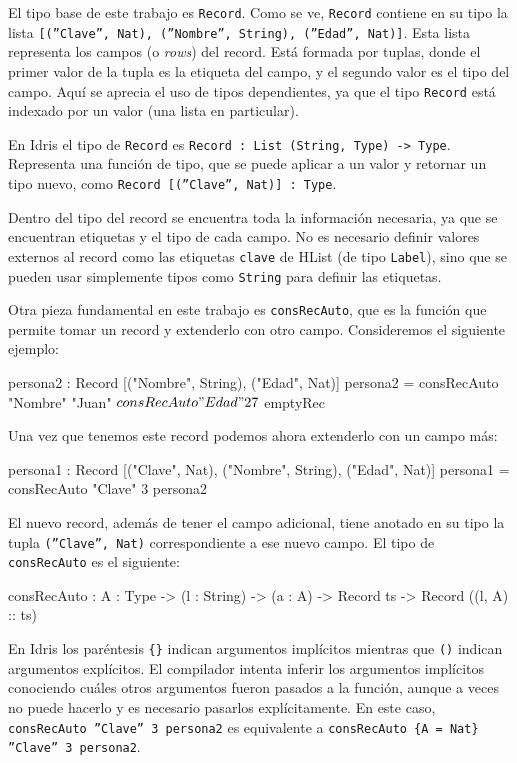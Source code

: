 El tipo base de este trabajo es \texttt{Record}. Como se ve, \texttt{Record} contiene en su tipo la lista \texttt{[(''Clave'', Nat), (''Nombre'', String), (''Edad'', Nat)]}. Esta lista representa los campos (o \textit{rows}) del record. Está formada por tuplas, donde el primer valor de la tupla es la etiqueta del campo, y el segundo valor es el tipo del campo. Aquí se aprecia el uso de tipos dependientes, ya que el tipo \texttt{Record} está indexado por un valor (una lista en particular).

En Idris el tipo de \texttt{Record} es \texttt{Record : List (String, Type) -> Type}. Representa una función de tipo, que se puede aplicar a un valor y retornar un tipo nuevo, como \texttt{Record [(''Clave'', Nat)] : Type}.

Dentro del tipo del record se encuentra toda la información necesaria, ya que se encuentran etiquetas y el tipo de cada campo. No es necesario definir valores externos al record como las etiquetas \texttt{clave} de HList (de tipo \texttt{Label}), sino que se pueden usar simplemente tipos como \texttt{String} para definir las etiquetas.

Otra pieza fundamental en este trabajo es \texttt{consRecAuto}, que es la función que permite tomar un record y extenderlo con otro campo. Consideremos el siguiente ejemplo:

\begin{code}
persona2 : Record [("Nombre", String), ("Edad", Nat)]
persona2 = consRecAuto "Nombre" "Juan" $
  consRecAuto "Edad" 27 $
  emptyRec
\end{code}

Una vez que tenemos este record podemos ahora extenderlo con un campo más:

\begin{code}
persona1 : Record [("Clave", Nat), ("Nombre", String),
  ("Edad", Nat)]
persona1 = consRecAuto "Clave" 3 persona2
\end{code}

El nuevo record, además de tener el campo adicional, tiene anotado en su tipo la tupla \texttt{(''Clave'', Nat)} correspondiente a ese nuevo campo. El tipo de \texttt{consRecAuto} es el siguiente:

\begin{code}
consRecAuto : {A : Type} -> (l : String) -> (a : A) ->
  Record ts -> Record ((l, A) :: ts)
\end{code}

En Idris los paréntesis \texttt{\{\}} indican argumentos implícitos mientras que \texttt{()} indican argumentos explícitos. El compilador intenta inferir los argumentos implícitos conociendo cuáles otros argumentos fueron pasados a la función, aunque a veces no puede hacerlo y es necesario pasarlos explícitamente. En este caso, \texttt{consRecAuto ''Clave'' 3 persona2} es equivalente a \texttt{consRecAuto \{A = Nat\} ''Clave'' 3 persona2}.

